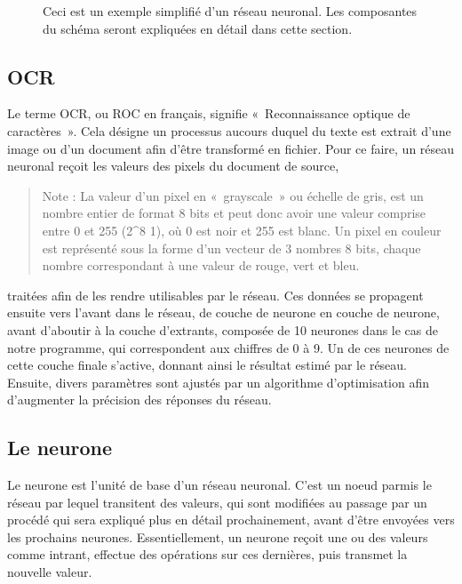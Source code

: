 \documentclass[letterpaper,10pt,french]{sphinxmanual}
\begin{document}
\begin{figure}[htbp]
\centering
\capstart

\noindent{}
\caption{Ceci est un exemple simplifié d’un réseau neuronal. Les composantes du schéma seront expliquées en détail dans cette section.}\label{\detokenize{notions_de_base:reseau-neuronal}}\end{figure}


\subsection{OCR}
\label{\detokenize{notions_de_base:ocr}}
Le terme OCR, ou ROC en français, signifie « Reconnaissance optique de caractères ». Cela désigne un processus aucours duquel du texte est extrait
d’une image ou d’un document afin d’être transformé en fichier. Pour ce faire, un réseau neuronal reçoit les valeurs des pixels du document de source,
\begin{quote}

Note : La valeur d’un pixel en « grayscale » ou échelle de gris, est un nombre entier
de format 8 bits et peut donc avoir
une valeur comprise entre 0 et 255 (2\textasciicircum{}8 \sphinxhyphen{} 1), où 0 est noir et 255 est blanc.
Un pixel en couleur est représenté sous la forme d’un vecteur de 3 nombres 8
bits, chaque nombre correspondant à une valeur de rouge, vert et bleu. 
\end{quote}

traitées afin de les rendre utilisables par le réseau. Ces données se propagent ensuite vers l’avant
dans le réseau, de couche de neurone en couche de neurone, avant d’aboutir à la couche d’extrants, composée de 10 neurones dans le cas de notre
programme, qui correspondent aux chiffres de 0 à 9. Un de ces neurones de cette couche finale s’active, donnant ainsi le résultat estimé par le réseau.
Ensuite, divers paramètres sont ajustés par un algorithme d’optimisation afin d’augmenter la précision des réponses du réseau.


\subsection{Le neurone}
\label{\detokenize{notions_de_base:le-neurone}}
Le neurone est l’unité de base d’un réseau neuronal. C’est un noeud parmis le réseau par lequel transitent des valeurs, qui sont modifiées
au passage par un procédé qui sera expliqué plus en détail prochainement, avant d’être envoyées vers les prochains neurones.
Essentiellement, un neurone reçoit une ou des valeurs comme intrant, effectue des opérations sur ces dernières, puis transmet la nouvelle valeur.
\end{document}
